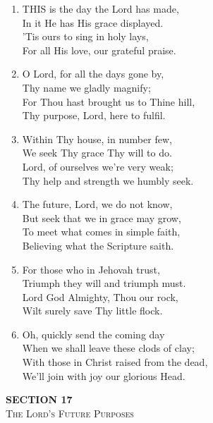 \documentclass[11pt,a4paper]{article}
\begin{document}
\begin{enumerate}
    \item THIS is the day the Lord has made, \\
        In it He has His grace displayed. \\
        'Tis ours to sing in holy lays, \\
        For all His love, our grateful praise.

    \item O Lord, for all the days gone by, \\
        Thy name we gladly magnify; \\
        For Thou hast brought us to Thine hill, \\
        Thy purpose, Lord, here to fulfil.

    \item Within Thy house, in number few, \\
        We seek Thy grace Thy will to do. \\
        Lord, of ourselves we're very weak; \\
        Thy help and strength we humbly seek.

    \item The future, Lord, we do not know, \\
        But seek that we in grace may grow, \\
        To meet what comes in simple faith, \\
        Believing what the Scripture saith.

    \item For those who in Jehovah trust, \\
        Triumph they will and triumph must. \\
        Lord God Almighty, Thou our rock, \\
        Wilt surely save Thy little flock.

    \item Oh, quickly send the coming day \\
        When we shall leave these clods of clay; \\
        With those in Christ raised from the dead, \\
        We'll join with joy our glorious Head.

\end{enumerate}

\newpage
\thispagestyle{empty}
\vspace*{3.5cm}
\begin{center}
    {\LARGE \textbf{SECTION 17}}\\[0.8em]
    {\Large \textsc{The Lord's Future Purposes}}
\end{center}
\vspace{3.5cm}
\end{document}
